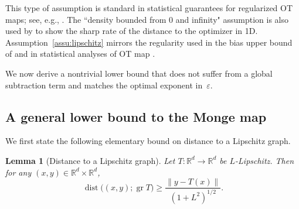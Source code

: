 \documentclass{article}
\theoremstyle{plain}
\newtheorem{lemma}[theorem]{Lemma}
\theoremstyle{definition}
\theoremstyle{remark}
\numberwithin{equation}{section}
\DeclareMathOperator{\gr}{gr}
\DeclareMathOperator{\dist}{dist}
\newcommand{\R}{\mathbb{R}}
\begin{document}
This type of assumption is standard in statistical guarantees for regularized OT maps; see, e.g., \citet{pooladian2021entropic}. 
The ``density bounded from 0 and infinity" assumption is also used by \citet{gonzalez2024sparsity} to show the sharp rate of the distance to the optimizer in 1D.
Assumption~\ref{assu:lipschitz} mirrors the regularity used in the bias upper bound of \citet{wiesel2025sparsity} and in statistical analyses of OT map \citep{hutter2021minimax, muzellec2024near, balakrishnan2025stability}.

We now derive a nontrivial lower bound that does not suffer from a global subtraction term and matches the optimal exponent in~$\varepsilon$.
\subsection{A general lower bound to the Monge map}\label{sec:general-lb}
We first state the following elementary bound on distance to a Lipschitz graph.
\begin{lemma}[Distance to a Lipschitz graph]\label{lem:lip-graph}
Let $T:\R^d\to\R^d$ be $L$-Lipschitz. Then for any $(x,y)\in\R^d\times\R^d$,
$$
\dist\big((x,y);\gr T\big)\ge\frac{\|y-T(x)\|}{(1+L^2)^{1/2}}.
$$
\end{lemma}
\end{document}
